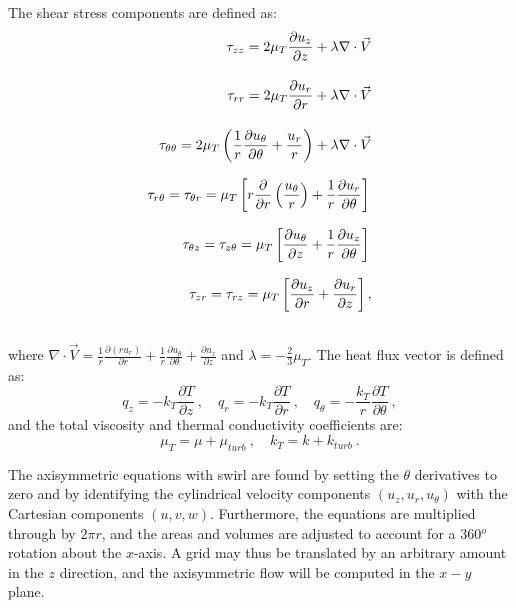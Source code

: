 The shear stress components are defined as:
\begin{eqnarray}
\nonumber \tau_{z z} = 2 \mu_T \frac{\partial u_z}{\partial z} + \lambda \nabla \cdot \vec{V} \rule[-.6cm]{0cm}{1cm} \\
\nonumber \tau_{r r} = 2 \mu_T \frac{\partial u_r}{\partial r} + \lambda \nabla \cdot \vec{V}
\rule[-.6cm]{0cm}{1cm} \\
\nonumber \tau_{\theta \theta} = 2 \mu_T \left( \frac{1}{r} \frac{\partial u_\theta}{\partial \theta} + \frac{u_r}{r} \right) + \lambda \nabla \cdot \vec{V}
\rule[-.6cm]{0cm}{1cm} \\
\tau_{r \theta} = \tau_{\theta r} = \mu_T \left [ r \frac{\partial }{\partial r} \left ( \frac{u_\theta}{r} \right ) + \frac{1}{r} \frac{\partial u_r}{\partial \theta} \right ]
\rule[-.6cm]{0cm}{1cm} \\
\nonumber \tau_{\theta z} = \tau_{z \theta} = \mu_T \left [ \frac{\partial u_\theta}{\partial z} + \frac{1}{r} \frac{\partial u_z}{\partial \theta} \right ]
\rule[-.6cm]{0cm}{1cm} \\
\nonumber \tau_{z r} = \tau_{r z} = \mu_T \left [ \frac{\partial u_z}{\partial r} + \frac{\partial u_r}{\partial z} \right ] , \\ \nonumber
\end{eqnarray}
where $\nabla \cdot \vec{V} = \frac{1}{r} \frac{\partial (r u_r)}{\partial r} + \frac{1}{r} \frac{\partial u_\theta}{\partial \theta} + \frac{\partial u_z}{\partial z}$ and $\lambda = - \frac{2}{3} \mu_T$.  The heat flux vector is defined as:
\begin{equation}
q_z = -k_T \frac{\partial T}{\partial z}  ~ , \quad q_r = -k_T \frac{\partial T}{\partial r} ~ , \quad q_\theta = -\frac{k_T}{r} \frac{\partial T}{\partial \theta} ~ ,
\end{equation}
and the total viscosity and thermal conductivity coefficients are:
\begin{equation}
\mu_T = \mu + \mu_{turb} ~ , \quad k_T = k + k_{turb} ~ .
\end{equation}

The axisymmetric equations with swirl are found by setting the
$\theta$ derivatives to zero and by identifying the cylindrical
velocity components $(u_z, u_r, u_\theta)$ with the Cartesian
components $(u, v, w)$.  Furthermore, the equations are multiplied
through by $2 \pi r$, and the areas and volumes are adjusted to
account for a 360$^o$ rotation about the $x$-axis.  A grid may thus be
translated by an arbitrary amount in the $z$ direction, and the
axisymmetric flow will be computed in the $x-y$ plane.

